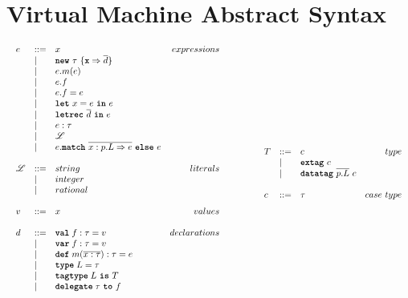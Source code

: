 \documentclass{article}
\newcommand{\keyw}[1]{\texttt{\textbf{#1}}}
\begin{document}
\section{Virtual Machine Abstract Syntax}

\[
\begin{array}{lll}
\begin{array}{lllr}
e & ::= & x & expressions \\
& | & \keyw{new}~\tau~\{\keyw{x} \Rightarrow \overline{d}\}&\\
& | & e.m(e) &\\
& | & e.f &\\
& | & e.f = e&\\
& | & \keyw{let}~x=e~\keyw{in}~e &\\
& | & \keyw{letrec}~\overline{d}~\keyw{in}~e &\\
& | & e : \tau&\\
& | & \mathscr{L} &\\
& | & e.\keyw{match}~\overline{x:p.L \Rightarrow e}~\keyw{else}~e &\\
&&\\
\mathscr{L} & ::= & string & literals \\
& | & integer &\\
& | & rational &\\
&&\\
v & ::= & x & values \\
&&\\
d & ::= & \keyw{val} \; f : \tau = v & declarations \\
  & |   & \keyw{var} \; f : \tau = v &\\
  & |   & \keyw{def} \; m(\overline{x:\tau}) : \tau = e &\\
  & |   & \keyw{type} \; L = \tau &\\
  & |   & \keyw{tagtype} \; L~\keyw{is}~T &\\
  & |   & \keyw{delegate} \; \tau~\keyw{to}~f &\\
&&\\
\end{array}
& ~~~~~~
&
\begin{array}{lllr}
T & ::= & c & type \\
& | & \keyw{extag}~c &\\
& | & \keyw{datatag}~\overline{p.L}~c &\\
&&\\
c & ::= & \tau & case ~ type \\

\end{array}
\end{array}\]
\end{document}
